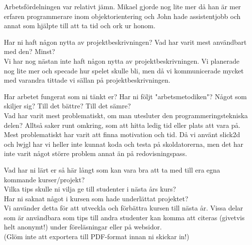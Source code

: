 Arbetsfördelningen var relativt jämn. Mikael gjorde nog lite mer då han är mer erfaren programmerare inom objektorientering och John hade assistentjobb och annat som hjälpte till att ta tid och ork ur honom.

Har ni haft någon nytta av projektbeskrivningen? Vad har varit mest användbart med den? Minst?\\

Vi har nog nästan inte haft någon nytta av projektbeskrivningen. Vi planerade nog lite mer och specade hur spelet skulle bli, men då vi kommunicerade mycket med varandra tittade vi sällan på projektbeskrivningen. 

Har arbetet fungerat som ni tänkt er? Har ni följt "arbetsmetodiken"? Något som skiljer sig? Till det bättre? Till det sämre?\\
Vad har varit mest problematiskt, om man utesluter den programmeringstekniska delen? Alltså saker runt omkring, som att hitta ledig tid eller plats att vara på.\\

Mest problematiskt har varit att finna motivation och tid. Då vi använt slick2d och lwjgl har vi heller inte kunnat koda och testa på skoldatorerna, men det har inte varit något större problem annat än på redovisningspass.

Vad har ni lärt er så här långt som kan vara bra att ta med till era egna kommande kurser/projekt?\\
Vilka tips skulle ni vilja ge till studenter i nästa års kurs?\\
Har ni saknat något i kursen som hade underlättat projektet?\\
\vspace{11pt}
Vi använder detta för att utveckla och förbättra kursen till nästa år.  Vissa delar som är användbara som tips till andra studenter kan komma att citeras (givetvis helt anonymt!) under föreläsningar eller på websidor.\\
(Glöm inte att exportera till PDF-format innan ni skickar in!)\\
